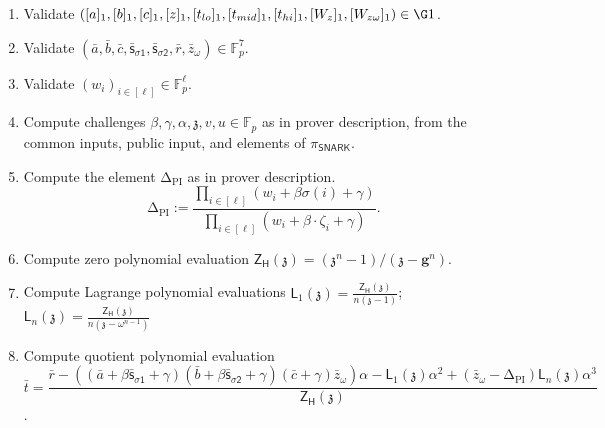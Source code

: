 \documentclass[11pt]{article} %
\newcommand{\F}{\ensuremath{\mathbb F}\xspace}
\newcommand{\chalpoint}{\ensuremath{\mathfrak{z}}\xspace}
\newcommand{\pubinputdelta}{\ensuremath{\mathrm{\Delta_{\mathrm{PI}}}}\xspace}
\newcommand{\defeq}{:=}
\newcommand{\hgen}{\ensuremath{\mathbf{g}}\xspace}
\newcommand{\sigpolyevala}{\ensuremath{\mathsf{\bar{s}_{\sigma1}}}\xspace}
\newcommand{\sigpolyevalb}{\ensuremath{\mathsf{\bar{s}_{\sigma2}}}\xspace}
\newcommand{\pubinppoly}{\ensuremath{\mathsf{PI}}\xspace}
\newcommand{\ZeroH}{\ensuremath{Z_{H}} \xspace}
\newcommand{\lagrangepoly}{\ensuremath{\mathsf{L}}\xspace}
\newcommand{\zeropoly}{\ensuremath{\mathsf{\ZeroH}}\xspace}
\begin{document}
\begin{enumerate}
 \item 	Validate $([a]_1, [b]_1, [c]_1, [z]_1, [t_{lo}]_1, [t_{mid}]_1, [t_{hi}]_1, [W_z]_1, [W_{z\omega}]_1) \in \G1$.
\item	Validate $(\bar{a}, \bar{b}, \bar{c}, \sigpolyevala, \sigpolyevalb, \bar{r}, \bar{z}_\omega) \in \F_p^{7}$.
\item	Validate $(w_i)_{i \in [\ell]} \in \F_p^{\ell}$.
	\item Compute challenges $\beta, \gamma,\alpha,\chalpoint,v,u \in \F_p$ as in prover description, from the common inputs, public input, and elements of $\pi_{\mathsf{SNARK}}$. 
	\item Compute the element \pubinputdelta as in prover description.
\[\pubinputdelta \defeq \frac{\prod_{i\in [\ell]} (w_i + \beta \sigma(i) +\gamma)}{\prod_{i\in [\ell]}  (w_i + \beta \cdot \zeta_i + \gamma)}.\]	
	\item Compute zero polynomial evaluation $\zeropoly(\chalpoint) = (\chalpoint^n - 1)/(\chalpoint- \hgen^{n})$.
\item	Compute Lagrange polynomial evaluations $\lagrangepoly_1(\chalpoint) = \frac{\zeropoly(\chalpoint)}{n(\chalpoint - 1)}$; $\lagrangepoly_n(\chalpoint) = \frac{\zeropoly(\chalpoint)}{n(\chalpoint - \omega^{n-1})}$


\item	Compute quotient polynomial evaluation $$\bar{t} = \frac{\bar{r} 
	-((\bar{a} + \beta \sigpolyevala + \gamma)(\bar{b} + \beta \sigpolyevalb + \gamma)(\bar{c} + \gamma)\bar{z}_\omega)\alpha
	- \lagrangepoly_1(\chalpoint)\alpha^2 + (\bar{z}_\omega -\pubinputdelta)  \lagrangepoly_n(\chalpoint) \alpha^3}{\zeropoly(\chalpoint) }$$.



\end{enumerate}
\end{document}
